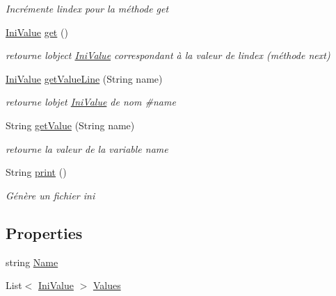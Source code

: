 \begin{DoxyCompactItemize}
\begin{DoxyCompactList}\small\item\em Incrémente l\textquotesingle{}index pour la méthode get \end{DoxyCompactList}\item 
\mbox{\hyperlink{class_n_t_k_1_1_i_o_1_1_ini_1_1_ini_value}{Ini\+Value}} \mbox{\hyperlink{class_n_t_k_1_1_i_o_1_1_ini_1_1_ini_group_a385dfd8ae8e0f6e79ca5f5798783f863}{get}} ()
\begin{DoxyCompactList}\small\item\em retourne l\textquotesingle{}object \mbox{\hyperlink{class_n_t_k_1_1_i_o_1_1_ini_1_1_ini_value}{Ini\+Value}} correspondant à la valeur de l\textquotesingle{}index (méthode next) \end{DoxyCompactList}\item 
\mbox{\hyperlink{class_n_t_k_1_1_i_o_1_1_ini_1_1_ini_value}{Ini\+Value}} \mbox{\hyperlink{class_n_t_k_1_1_i_o_1_1_ini_1_1_ini_group_a5090c7ed734ea691b6f8f53bda852d84}{get\+Value\+Line}} (String name)
\begin{DoxyCompactList}\small\item\em retourne l\textquotesingle{}objet {\ttfamily \mbox{\hyperlink{class_n_t_k_1_1_i_o_1_1_ini_1_1_ini_value}{Ini\+Value}}} de nom \#name \end{DoxyCompactList}\item 
String \mbox{\hyperlink{class_n_t_k_1_1_i_o_1_1_ini_1_1_ini_group_a240303ccd568669185baea6962e9b100}{get\+Value}} (String name)
\begin{DoxyCompactList}\small\item\em retourne la valeur de la variable {\ttfamily name} \end{DoxyCompactList}\item 
String \mbox{\hyperlink{class_n_t_k_1_1_i_o_1_1_ini_1_1_ini_group_a7525aa7eb5880cd7fcaa047f1ff83ee6}{print}} ()
\begin{DoxyCompactList}\small\item\em Génère un fichier ini \end{DoxyCompactList}\end{DoxyCompactItemize}
\subsection*{Properties}
\begin{DoxyCompactItemize}
\item 
string \mbox{\hyperlink{class_n_t_k_1_1_i_o_1_1_ini_1_1_ini_group_a920a16272bc8eed48620b7c1e6454300}{Name}}
\item 
List$<$ \mbox{\hyperlink{class_n_t_k_1_1_i_o_1_1_ini_1_1_ini_value}{Ini\+Value}} $>$ \mbox{\hyperlink{class_n_t_k_1_1_i_o_1_1_ini_1_1_ini_group_a81d6a427065677aa56bd10c2cad860e4}{Values}}
\end{DoxyCompactItemize}


